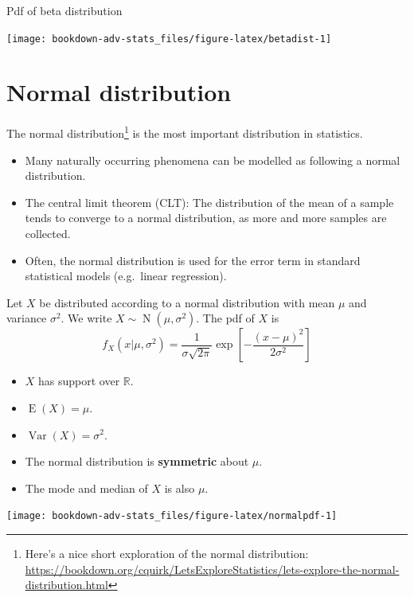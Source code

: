 \documentclass[
]{book}
\providecommand{\tightlist}{%
  \setlength{\itemsep}{0pt}\setlength{\parskip}{0pt}}
\DeclareMathOperator{\E}{E}
\DeclareMathOperator{\Var}{Var}
\DeclareMathOperator{\N}{N}
\newcommand{\bbR}{\mathbb{R}}
\theoremstyle{definition}
\theoremstyle{definition}
\theoremstyle{definition}
\theoremstyle{definition}
\theoremstyle{remark}
\begin{document}
Pdf of beta distribution

\begin{center}\texttt{[image: bookdown-adv-stats\_files/figure-latex/betadist-1]} \end{center}

\hypertarget{normal-distribution}{%
\section{Normal distribution}\label{normal-distribution}}

The normal distribution\footnote{Here's a nice short exploration of the normal distribution: \url{https://bookdown.org/cquirk/LetsExploreStatistics/lets-explore-the-normal-distribution.html}} is the most important distribution in statistics.

\begin{itemize}
\tightlist
\item
  Many naturally occurring phenomena can be modelled as following a normal distribution.
\item
  The central limit theorem (CLT): The distribution of the mean of a sample tends to converge to a normal distribution, as more and more samples are collected.
\item
  Often, the normal distribution is used for the error term in standard statistical models (e.g.~linear regression).
\end{itemize}

Let \(X\) be distributed according to a normal distribution with mean \(\mu\) and variance \(\sigma^2\). We write \(X\sim\N(\mu,\sigma^2)\).
The pdf of \(X\) is
\[
f_X(x|\mu,\sigma^2)= \frac{1}{\sigma\sqrt{2\pi}}\exp\left[-\frac{(x-\mu)^2}{2\sigma^2} \right]
\]

\begin{itemize}
\tightlist
\item
  \(X\) has support over \(\bbR\).
\item
  \(\E(X)=\mu\).
\item
  \(\Var(X)=\sigma^2\).
\item
  The normal distribution is \textbf{symmetric} about \(\mu\).
\item
  The mode and median of \(X\) is also \(\mu\).
\end{itemize}

\begin{center}\texttt{[image: bookdown-adv-stats\_files/figure-latex/normalpdf-1]} \end{center}
\end{document}
